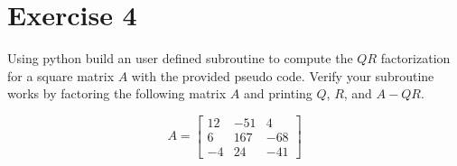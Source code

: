 \section{Exercise 4}
Using python build an user defined subroutine to compute the $QR$
factorization for a square matrix $A$ with the provided pseudo code. Verify
your subroutine works by factoring the following matrix $A$ and printing
$Q$, $R$, and $A-QR$.

\begin{equation}
  A =
  \begin{bmatrix}
    12  &  -51   &  4   \\
    6   &  167   &  -68   \\
    -4  &  24    &  -41
  \end{bmatrix}
\end{equation}

